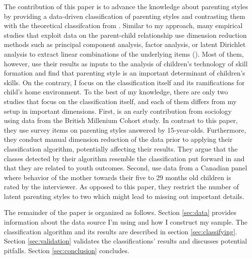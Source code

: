 
The contribution of this paper is to advance the knowledge about parenting styles by providing a data-driven classification of parenting styles and contrasting them with the theoretical classifcation from \textcite{doepkeParentingStyleAltruism2017}. Similar to my approach, many empirical studies that exploit data on the parent-child relationship use dimension reduction methods such as principal component analysis, factor analysis, or latent Dirichlet analysis to extract linear combinations of the underlying items (\cite{ermischOriginsSocialImmobility2008, chanParentingStyleYouth2011, fioriniHowAllocationChildren2014, bonoEarlyMaternalTime2016, cobb-clarkParentingStyleInvestment2019, zumbuehlParentalInvolvementIntergenerational2020, rauhParentingTypes2020}). Most of them, however, use their results as inputs to the analysis of children's technology of skill formation and find that parenting style is an important determinant of children's skills. On the contrary, I focus on the classification itself and its ramifications for child's home environment. To the best of my knowledge, there are only two studies that focus on the classification itself, and each of them differs from my setup in important dimensions. First, \textcite{chanParentingStyleYouth2011} is an early contribution from sociology using data from the British Millenium Cohort study. In contrast to this paper, they use survey items on parenting styles answered by 15-year-olds. Furthermore, they conduct manual dimension reduction of the data prior to applying their classification algorithm, potentially affecting their results. They argue that the classes detected by their algorithm resemble the classification put forward in \textcite{baumrindChildCarePractices1967} and that they are related to youth outcomes. Second, \textcite{rauhParentingTypes2020} use data from a Canadian panel where behavior of the mother towards their five to 29 months old children is rated by the interviewer. As opposed to this paper, they restrict the number of latent parenting styles to two which might lead to missing out important details.

The remainder of the paper is organized as follows. Section \ref{sec:data} provides information about the data source I'm using and how I construct my sample. The classification algorithm and its results are described in section \ref{sec:classifying}. Section \ref{sec:validation} validates the classifications' results and discusses potential pitfalls. Section \ref{sec:conclusion} concludes.


